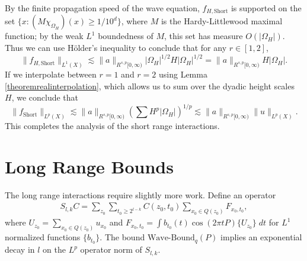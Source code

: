 %
By the finite propagation speed of the wave equation, $f_{H,\text{Short}}$ is supported on the set $\{ x: (M \chi_{\Omega_H})(x) \geq 1/10^d \}$, where $M$ is the Hardy-Littlewood maximal function; by the weak $L^1$ boundedness of $M$, this set has measure $O(|\Omega_H|)$. Thus we can use H\"{o}lder's inequality to conclude that for any $r \in [1,2]$,
%
\begin{equation}
    \| f_{H,\text{Short}} \|_{L^1(X)} \lesssim \| a \|_{R^{s,p}[0,\infty)} |\Omega_H|^{1/2} H |\Omega_H|^{1/2} = \| a \|_{R^{s,p}[0,\infty)} H |\Omega_H|.
\end{equation}
%
If we interpolate between $r = 1$ and $r = 2$ using Lemma \ref{theoremrealinterpolation}, which allows us to sum over the dyadic height scales $H$, we conclude that
%
\begin{equation}
    \| f_{\text{Short}} \|_{L^p(X)} \lesssim  \| a \|_{R^{s,p}[0,\infty)} \left( \sum H^p |\Omega_H| \right)^{1/p} \lesssim \| a \|_{R^{s,p}[0,\infty)} \| u \|_{L^p(X)}.
\end{equation}
%
This completes the analysis of the short range interactions.

\section{Long Range Bounds}

The long range interactions require slightly more work. Define an operator
%
\begin{equation}
\begin{split}
    S_{l,k} C = \sum\nolimits_{z_0} \sum\nolimits_{t_0 \geq 2^{l-k}} C(z_0,t_0) \sum\nolimits_{x_0 \in Q(z_0)} F_{x_0,t_0},
\end{split}
\end{equation}
%
where $U_{z_0} = \sum_{x_0 \in Q(z_0)} u_{x_0}$ and $F_{x_0,t_0} = \int b_{t_0}(t) \cos(2 \pi t P) \{ U_{z_0} \}\; dt$ for $L^1$ normalized functions $\{ b_{t_0} \}$. The bound $\text{Wave-Bound}_q(P)$ implies an exponential decay in $l$ on the $L^p$ operator norm of $S_{l,k}$.


